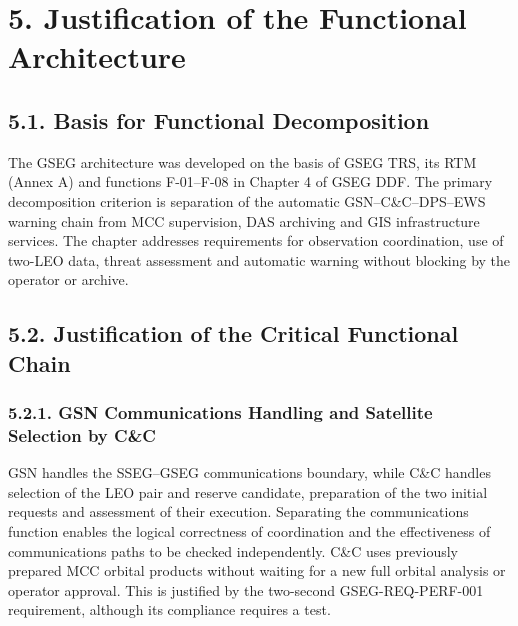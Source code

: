 \section{5. Justification of the Functional Architecture}\label{ddjf-5}

\subsection{5.1. Basis for Functional Decomposition}\label{ddjf-5-1}

The GSEG architecture was developed on the basis of GSEG TRS, its RTM (Annex A) and functions F-01–F-08 in Chapter 4 of GSEG DDF. The primary decomposition criterion is separation of the automatic GSN–C\&C–DPS–EWS warning chain from MCC supervision, DAS archiving and GIS infrastructure services. The chapter addresses requirements for observation coordination, use of two-LEO data, threat assessment and automatic warning without blocking by the operator or archive.

\subsection{5.2. Justification of the Critical Functional Chain}\label{ddjf-5-2}

\subsubsection{5.2.1. GSN Communications Handling and Satellite Selection by C\&C}\label{ddjf-5-2-1}

GSN handles the SSEG–GSEG communications boundary, while C\&C handles selection of the LEO pair and reserve candidate, preparation of the two initial requests and assessment of their execution. Separating the communications function enables the logical correctness of coordination and the effectiveness of communications paths to be checked independently. C\&C uses previously prepared MCC orbital products without waiting for a new full orbital analysis or operator approval. This is justified by the two-second GSEG-REQ-PERF-001 requirement, although its compliance requires a test.


